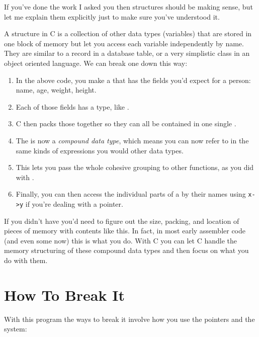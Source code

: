 If you've done the work I asked you then structures should be
making sense, but let me explain them explicitly just to make
sure you've understood it.

A structure in C is a collection of other data types (variables)
that are stored in one block of memory but let you access each
variable independently by name.  They are similar to a record
in a database table, or a very simplistic class in an object
oriented language.  We can break one down this way:

\begin{enumerate}
\item In the above code, you make a  that has the fields 
    you'd expect for a person: name, age, weight, height.
\item Each of those fields has a type, like .
\item C then packs those together so they can all be contained in 
    one single .
\item The  is now a \emph{compound data type}, which
    means you can now refer to  in the same kinds
    of expressions you would other data types.
\item This lets you pass the whole cohesive grouping to other
    functions, as you did with .
\item Finally, you can then access the individual parts of a
     by their names using \verb|x->y| if you're
    dealing with a pointer.
\end{enumerate}

If you didn't have  you'd need to figure out
the size, packing, and location of pieces of memory with
contents like this.  In fact, in most early assembler code
(and even some now) this is what you do.  With C you can 
let C handle the memory structuring of these compound data types
and then focus on what you do with them.


\section{How To Break It}

With this program the ways to break it involve how you use
the pointers and the  system:

